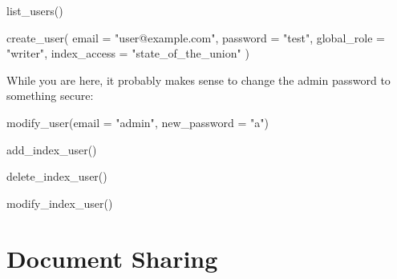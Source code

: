 \documentclass[
  letterpaper,
  DIV=11,
  numbers=noendperiod]{scrreprt}
\newenvironment{Shaded}{\begin{snugshade}}{\end{snugshade}}
\newcommand{\AttributeTok}[1]{\textcolor[rgb]{0.40,0.45,0.13}{#1}}
\newcommand{\FunctionTok}[1]{\textcolor[rgb]{0.28,0.35,0.67}{#1}}
\newcommand{\NormalTok}[1]{\textcolor[rgb]{0.00,0.23,0.31}{#1}}
\newcommand{\StringTok}[1]{\textcolor[rgb]{0.13,0.47,0.30}{#1}}
\begin{document}
\begin{Shaded}
\begin{Highlighting}[]
\FunctionTok{list\_users}\NormalTok{()}
\end{Highlighting}
\end{Shaded}

\begin{Shaded}
\begin{Highlighting}[]
\FunctionTok{create\_user}\NormalTok{(}
  \AttributeTok{email =} \StringTok{"user@example.com"}\NormalTok{,}
  \AttributeTok{password =} \StringTok{"test"}\NormalTok{,}
  \AttributeTok{global\_role =} \StringTok{"writer"}\NormalTok{,}
  \AttributeTok{index\_access =} \StringTok{"state\_of\_the\_union"}
\NormalTok{)}
\end{Highlighting}
\end{Shaded}

While you are here, it probably makes sense to change the admin password
to something secure:

\begin{Shaded}
\begin{Highlighting}[]
\FunctionTok{modify\_user}\NormalTok{(}\AttributeTok{email =} \StringTok{"admin"}\NormalTok{, }\AttributeTok{new\_password =} \StringTok{"a"}\NormalTok{)}
\end{Highlighting}
\end{Shaded}

\begin{Shaded}
\begin{Highlighting}[]
\FunctionTok{add\_index\_user}\NormalTok{()}
\end{Highlighting}
\end{Shaded}

\begin{Shaded}
\begin{Highlighting}[]
\FunctionTok{delete\_index\_user}\NormalTok{()}
\end{Highlighting}
\end{Shaded}

\begin{Shaded}
\begin{Highlighting}[]
\FunctionTok{modify\_index\_user}\NormalTok{()}
\end{Highlighting}
\end{Shaded}

\section{Document Sharing}\label{document-sharing}
\end{document}
